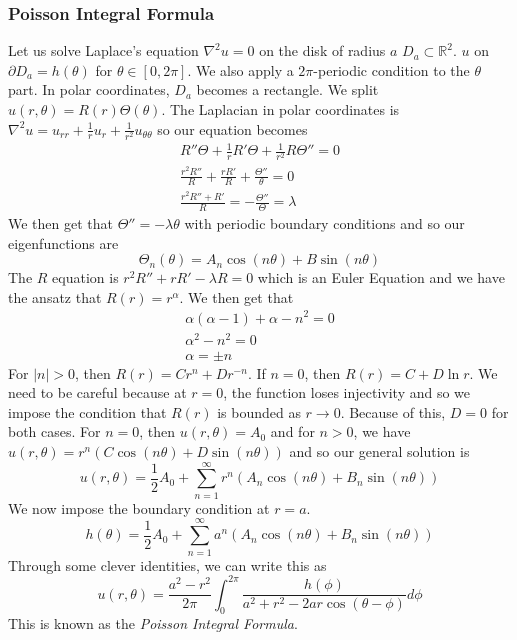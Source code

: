 \documentclass{article}
\newcommand{\R}{\mathbb{R}}
\newcommand{\lap}{\nabla ^2}
\theoremstyle{definition}
\begin{document}
\subsubsection{Poisson Integral Formula}
Let us solve Laplace's equation $\lap u=0$ on the disk of radius $a$ $D_a \subset \R^2$. $u$ on $\partial D_a = h(\theta)$ for $\theta \in [0,2\pi]$. We also apply a $2\pi$-periodic condition to the $\theta$ part. In polar coordinates, $D_a$ becomes a rectangle. We split $u(r,\theta) = R(r) \Theta (\theta)$. The Laplacian in polar coordinates is $\lap u=u_{rr} + \frac{1}{r}u_r+\frac{1}{r^2} u_{\theta \theta}$ so our equation becomes 
\begin{equation*}
    \begin{split}
        R'' \Theta + \frac{1}{r}R'\Theta + \frac{1}{r^2} R\Theta '' = 0\\ 
        \frac{r^2R''}{R} + \frac{rR'}{R} +\frac{\Theta ''}{\theta} =0 \\
        \frac{r^2R''+R'}{R} = -\frac{\Theta ''}{\Theta}=\lambda
    \end{split}
\end{equation*}
We then get that $\Theta'' = -\lambda \theta$ with periodic boundary conditions and so our eigenfunctions are 
\begin{equation*}
    \Theta _n(\theta) =A_n\cos (n\theta) +B\sin (n\theta)
\end{equation*}
The $R$ equation is $r^2 R''+rR' -\lambda R=0$ which is an Euler Equation and we have the ansatz that $R(r) = r^\alpha$. We then get that 
\begin{equation*}
    \begin{split}
        \alpha(\alpha-1)+\alpha - n^2 =0 \\
        \alpha ^2 -n^2=0 \\
        \alpha = \pm n
    \end{split} 
\end{equation*}
For $|n|>0$, then $R(r) = Cr^n+Dr^{-n}$. If $n=0$, then $R(r) = C+D\ln r$. We need to be careful because at $r=0$, the function loses injectivity and so we impose the condition that $R(r)$ is bounded as $r\to 0$. Because of this, $D =0$ for both cases. For $n=0$, then $u(r,\theta) =A_0$ and for $n>0$, we have $u(r, \theta) = r^n(C\cos (n\theta)+D\sin(n\theta))$ and so our general solution is 
\begin{equation*}
    u(r,\theta) = \frac{1}{2}A_0 +\sum^\infty_{n=1}r^n(A_n\cos(n\theta) + B_n \sin (n\theta))
\end{equation*}
We now impose the boundary condition at $r=a$.
\begin{equation*}
    h(\theta) = \frac{1}{2}A_0 + \sum^\infty_{n=1} a^n ( A_n\cos (n\theta) +B_n \sin (n\theta))
\end{equation*}
Through some clever identities, we can write this as 
\begin{equation*}
    u(r,\theta) = \frac{a^2-r^2}{2\pi } \int^{2\pi}_0 \frac{h(\phi)}{a^2 +r^2 -2ar\cos ( \theta - \phi)}d\phi
\end{equation*}
This is known as the \emph{Poisson Integral Formula}.
\end{document}
